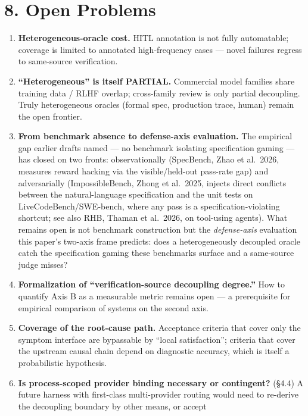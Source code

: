 \documentclass[
  11pt,
]{article}
\providecommand{\tightlist}{%
  \setlength{\itemsep}{0pt}\setlength{\parskip}{0pt}}
\begin{document}
\section{8. Open Problems}\label{open-problems}

\begin{enumerate}
\def\labelenumi{\arabic{enumi}.}
\tightlist
\item
  \textbf{Heterogeneous-oracle cost.} HITL annotation is not fully
  automatable; coverage is limited to annotated high-frequency cases ---
  novel failures regress to same-source verification.
\item
  \textbf{``Heterogeneous'' is itself PARTIAL.} Commercial model
  families share training data / RLHF overlap; cross-family review is
  only partial decoupling. Truly heterogeneous oracles (formal spec,
  production trace, human) remain the open frontier.
\item
  \textbf{From benchmark absence to defense-axis evaluation.} The
  empirical gap earlier drafts named --- no benchmark isolating
  specification gaming --- has closed on two fronts: observationally
  (SpecBench, Zhao et al.~2026, measures reward hacking via the
  visible/held-out pass-rate gap) and adversarially (ImpossibleBench,
  Zhong et al.~2025, injects direct conflicts between the
  natural-language specification and the unit tests on
  LiveCodeBench/SWE-bench, where any pass is a specification-violating
  shortcut; see also RHB, Thaman et al.~2026, on tool-using agents).
  What remains open is not benchmark construction but the
  \emph{defense-axis} evaluation this paper's two-axis frame predicts:
  does a heterogeneously decoupled oracle catch the specification gaming
  these benchmarks surface and a same-source judge misses?
\item
  \textbf{Formalization of ``verification-source decoupling degree.''}
  How to quantify Axis B as a measurable metric remains open --- a
  prerequisite for empirical comparison of systems on the second axis.
\item
  \textbf{Coverage of the root-cause path.} Acceptance criteria that
  cover only the symptom interface are bypassable by ``local
  satisfaction''; criteria that cover the upstream causal chain depend
  on diagnostic accuracy, which is itself a probabilistic hypothesis.
\item
  \textbf{Is process-scoped provider binding necessary or contingent?}
  (§4.4) A future harness with first-class multi-provider routing would
  need to re-derive the decoupling boundary by other means, or accept

\end{enumerate}
\end{document}
